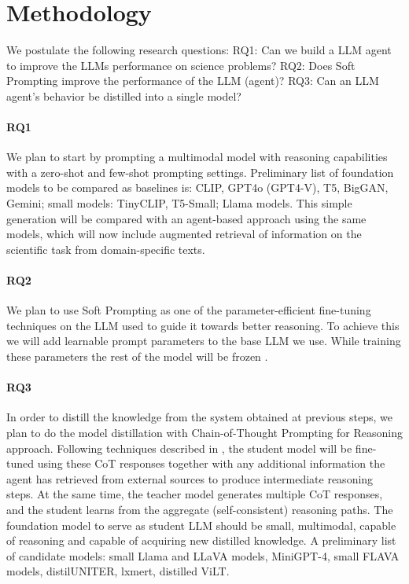 \documentclass[10pt]{article}
\newcommand{\katja}[1]{\textbf{\textcolor{teal}{(Katja) #1}}}
\begin{document}

\section{Methodology}
We postulate the following research questions: 
RQ1: Can we build a LLM agent to improve the LLMs performance on science problems?
RQ2: Does Soft Prompting improve the performance of the LLM (agent)?
RQ3: Can an LLM agent's behavior be distilled into a single model?

\paragraph{RQ1} 
We plan to start by prompting a multimodal model with reasoning capabilities with a zero-shot and few-shot prompting settings. Preliminary list of foundation models to be compared as baselines is: CLIP, GPT4o (GPT4-V), T5, BigGAN, Gemini; small models: TinyCLIP, T5-Small; Llama models. This simple generation will be compared with an agent-based approach using the same models, which will now include augmented retrieval of information on the scientific task from domain-specific texts. 

\paragraph{RQ2}
We plan to use Soft Prompting as one of the parameter-efficient fine-tuning techniques on the LLM used to guide it towards better reasoning. To achieve this we will add learnable prompt parameters to the base LLM we use. While training these parameters the rest of the model will be frozen \cite{lester2021prompt}.

\paragraph{RQ3}
In order to distill the knowledge from the system obtained at previous steps, we plan to do the model distillation with Chain-of-Thought Prompting for Reasoning approach. Following techniques described in \cite{magister2022teaching} \cite{wei2022chain}, the student model will be fine-tuned using these CoT responses together with any additional information the agent has retrieved from external sources to produce intermediate reasoning steps. At the same time, the teacher model generates multiple CoT responses, and the student learns from the aggregate (self-consistent) reasoning paths. 
The foundation model to serve as student LLM should be small, multimodal, capable of reasoning and capable of acquiring new distilled knowledge. A preliminary list of candidate models: small Llama and LLaVA models, MiniGPT-4, small FLAVA models, distilUNITER, lxmert, distilled ViLT.
\end{document}
